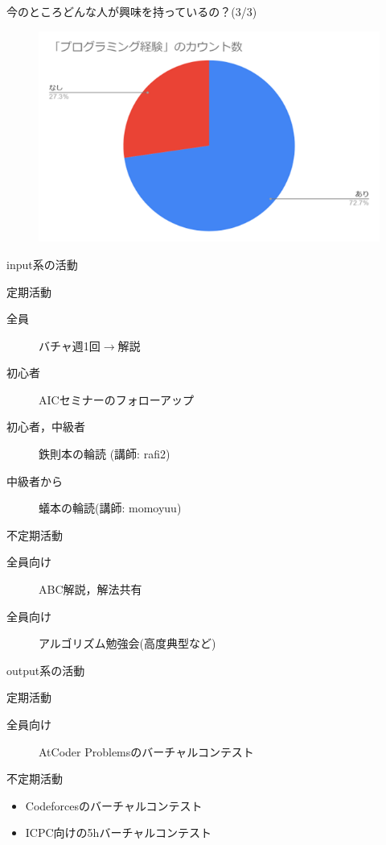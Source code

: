 \documentclass[12pt, unicode]{beamer}
\begin{document}
  \begin{frame}{今のところどんな人が興味を持っているの？(3/3)}
    \begin{figure}
      \centering
      \includegraphics[scale = 0.5]{experience.png}
    \end{figure}
  \end{frame}
  \begin{frame}{input系の活動}
    \begin{block}{定期活動}
      \begin{description}
        \item[全員] バチャ週1回$\rightarrow$解説 \pause
        \item[初心者] AICセミナーのフォローアップ \pause
        \item[初心者，中級者] 鉄則本の輪読 (講師: \textcolor[HTML]{008000}{rafi2})
        \item[中級者から] 蟻本の輪読(講師: \textcolor[HTML]{c0c000}{momoyuu}) \pause
      \end{description}
    \end{block}
    \begin{exampleblock}{不定期活動}
      \begin{description}
        \item[全員向け] ABC解説，解法共有 \pause
        \item[全員向け] アルゴリズム勉強会(高度典型など) 
      \end{description}
    \end{exampleblock}
  \end{frame}
  \begin{frame}{output系の活動}
    \begin{block}{定期活動}
      \begin{description}
        \item[全員向け] AtCoder Problemsのバーチャルコンテスト \pause
      \end{description}
    \end{block}
    \begin{exampleblock}{不定期活動}
      \begin{itemize}
        \item Codeforcesのバーチャルコンテスト \pause
        \item ICPC向けの5hバーチャルコンテスト
      \end{itemize}
    \end{exampleblock}
  \end{frame}
\end{document}
